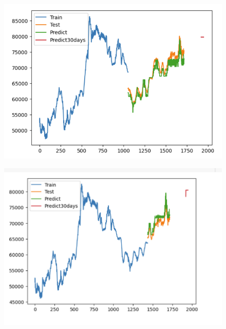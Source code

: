 \documentclass{article}
\begin{document}
\begin{multicols}{2}
\begin{figure}[H]
    \centering
    \begin{minipage}{0.15\textwidth}
    \centering
    \includegraphics[width=1\textwidth]{Image/Light GBM/SS_6_4__30.png}
   
    \label{fig:1}
    \end{minipage}%
    \begin{minipage}{0.15\textwidth}
    \centering
    \includegraphics[width=1\textwidth]{Image/Light GBM/SS_7_3_30.png}
  

\end{minipage}
\end{figure}
\end{multicols}
\end{document}
